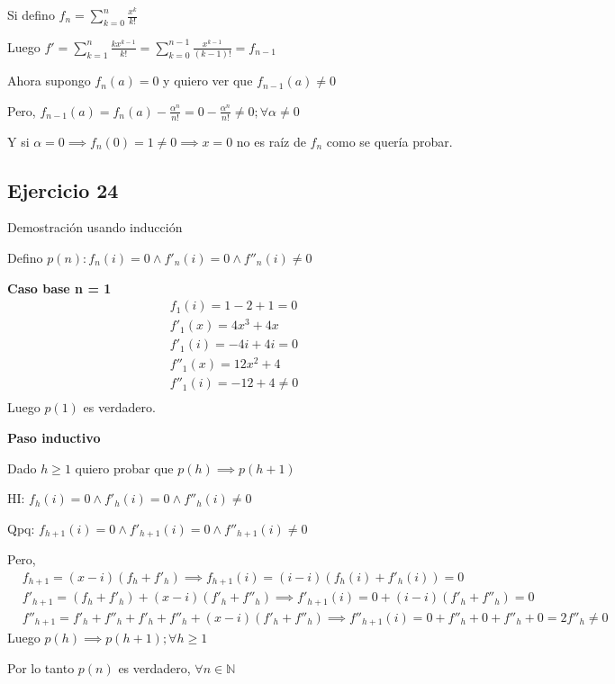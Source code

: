 Si defino $ f_n = \sum_{k = 0}^{n}\frac{x^k}{k!} $

Luego $ f' = \sum_{k = 1}^{n}\frac{kx^{k-1}}{k!} = \sum_{k = 0}^{n-1}\frac{x^{k-1}}{(k-1)!} = f_{n-1} $

Ahora supongo $ f_n(a) = 0 $ y quiero ver que $ f_{n-1}(a) \neq 0 $

Pero, $ f_{n-1}(a) = f_n(a) - \frac{\alpha^n}{n!} = 0 - \frac{\alpha^n}{n!} \neq 0; \forall \alpha \neq 0 $

Y si $ \alpha = 0 \implies f_n(0) = 1 \neq 0 \implies x = 0 $ no es raíz de $ f_n $ como se quería probar.

\subsection{Ejercicio 24}

Demostración usando inducción

Defino $ p(n): f_n(i) = 0 \wedge f'_n(i) = 0 \wedge f''_n(i) \neq 0 $

\textbf{Caso base n = 1}
\begin{align*}
    f_1(i) = 1-2+1 = 0 \\
    f'_1(x) = 4x^3+4x \\
    f'_1(i) = -4i + 4i = 0 \\
    f''_1(x) = 12x^2 + 4 \\
    f''_1(i) = -12+4 \neq 0 \\
\end{align*}
Luego $ p(1) $ es verdadero.

\textbf{Paso inductivo}

Dado $ h \geq 1 $ quiero probar que $ p(h) \implies p(h+1) $

HI: $ f_h(i) = 0 \wedge f'_h(i) = 0 \wedge f''_h(i) \neq 0 $

Qpq: $ f_{h+1}(i) = 0 \wedge f'_{h+1}(i) = 0 \wedge f''_{h+1}(i) \neq 0 $

Pero,
\begin{align*}
    &f_{h+1} = (x-i)(f_h + f'_h) \implies f_{h+1}(i) = (i-i)(f_h(i) + f'_h(i)) = 0 \\
    &f'_{h+1} = (f_h + f'_h) + (x-i)(f'_h + f''_h) \implies f'_{h+1}(i) = 0 + (i-i)(f'_h + f''_h) = 0 \\
    &f''_{h+1} = f'_h + f''_h + f'_h + f''_h + (x-i)(f'_h + f''_h) \implies f''_{h+1}(i) = 0 + f''_h + 0 + f''_h + 0 = 2f''_h \neq 0
\end{align*}
Luego $ p(h) \implies p(h+1); \forall h \geq 1 $

Por lo tanto $ p(n) $ es verdadero, $ \forall n \in \mathbb{N} $


